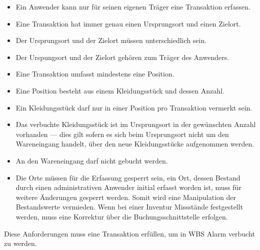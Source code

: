 \begin{itemize}
\item Ein Anwender kann nur für seinen eigenen Träger eine Transaktion erfassen.
\item Eine Transaktion hat immer genau einen Ursprungsort und einen Zielort.
\item Der Ursprungsort und der Zielort müssen unterschiedlich sein.
\item Der Urspungsort und der Zielort gehören zum Träger des Anwenders.
\item Eine Transaktion umfasst mindestens eine Position. 
\item Eine Position besteht aus einem Kleidungsstück und dessen Anzahl.
\item Ein Kleidungsstück darf nur in einer Position pro Transaktion vermerkt sein.
\item Das verbuchte Kleidungsstück ist im Ursprungsort in der gewünschten Anzahl vorhanden --- dies gilt sofern es sich beim Ursprungsort nicht um den Wareneingang handelt, über den neue Kleidungsstücke aufgenommen werden. 
\item An den Wareneingang darf nicht gebucht werden.
\item Die Orte müssen für die Erfassung gesperrt sein, \dah ein Ort, dessen Bestand durch einen administrativen Anwender initial erfasst worden ist, muss für weitere Änderungen gesperrt werden. Somit wird eine Manipulation der Bestandswerte vermieden. Wenn bei einer Inventur Missstände festgestellt werden, muss eine Korrektur über die Buchungsschnittstelle erfolgen.
\end{itemize}

Diese Anforderungen muss eine Transaktion erfüllen, um in WBS Alarm verbucht zu werden.


